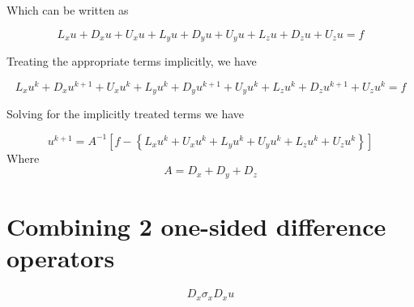 \documentclass[11pt]{article}
\begin{document}
Which can be written as

\begin{equation}
	L_x u + D_x u + U_x u +
	L_y u + D_y u + U_y u +
	L_z u + D_z u + U_z u
	= f
\end{equation}

Treating the appropriate terms implicitly, we have

\begin{equation}
	L_x u^{k} + D_x u^{k+1} + U_x u^{k} +
	L_y u^{k} + D_y u^{k+1} + U_y u^{k} +
	L_z u^{k} + D_z u^{k+1} + U_z u^{k}
	= f
\end{equation}

Solving for the implicitly treated terms we have

\begin{equation}
	u^{k+1}
	=
	A^{-1}
	\left[
	f -
	\left\{
	L_x u^{k} + U_x u^{k} +
	L_y u^{k} + U_y u^{k} +
	L_z u^{k} + U_z u^{k}
	\right\}
	\right]
\end{equation}
Where
\begin{equation}
	A =
	D_x +
	D_y +
	D_z
\end{equation}

\section{Combining 2 one-sided difference operators}
\begin{equation}
	D_x \sigma_x D_x u
\end{equation}
\end{document}
